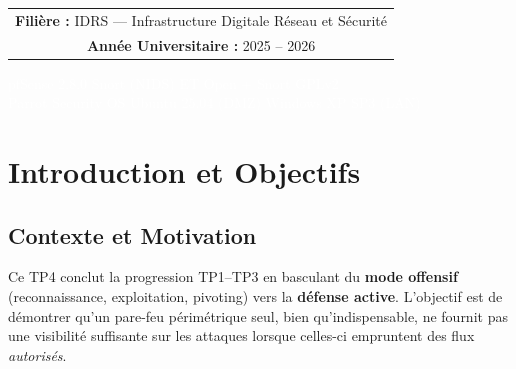 \documentclass[12pt,a4paper,openany]{report}
\newif\ifshowpagenumbers
\newcommand{\hidepagenumbers}{\showpagenumbersfalse\pagestyle{empty}}
\newcommand{\showpagenumbers}{\showpagenumberstrue\pagestyle{fancy}}
\begin{document}
\begin{titlepage}
{\begin{tabular}{c}
				\textbf{\color{primary}Filière :} IDRS --- Infrastructure Digitale Réseau et Sécurité \\[0.3cm]
				\textbf{\color{primary}Année Universitaire :} 2025 -- 2026 \\
			\end{tabular}
		}
		
		\vfill
		
		\noindent
		\colorbox{primary}{%
			\parbox{\dimexpr\textwidth-2\fboxsep}{%
				\vspace{0.35cm}
				\centering
				{\small\textcolor{white}{%
						pfSense 2.8.0
						\quad\textbullet\quad Snort (NIDS)
						\quad\textbullet\quad ET Open + Snort GPLv2}}\\[0.2cm]
				{\small\textcolor{white}{%
						Parrot Security OS
						\quad\textbullet\quad Ubuntu 25.04 (DMZ)
						\quad\textbullet\quad Windows XP SP3 (LAN)}}\\[0.35cm]
			}%
		}%
	\end{titlepage}
	
	\hidepagenumbers
	\tableofcontents
	\newpage
	\listoffigures
	\listoftables
	\newpage
	
	\cleardoublepage
	\showpagenumbers
	\setcounter{page}{1}
	
	\chapter{Introduction et Objectifs}
	
	\section{Contexte et Motivation}
	
	Ce TP4 conclut la progression TP1--TP3 en basculant du \textbf{mode offensif} (reconnaissance, exploitation, pivoting) vers la \textbf{défense active}. L'objectif est de démontrer qu'un pare-feu périmétrique seul, bien qu'indispensable, ne fournit pas une visibilité suffisante sur les attaques lorsque celles-ci empruntent des flux \textit{autorisés}.  
	
\end{document}
